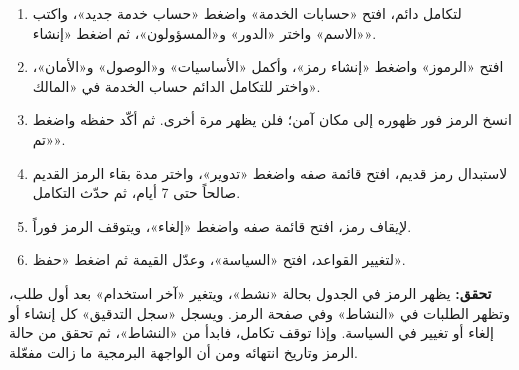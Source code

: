 \begin{enumerate}
\item لتكامل دائم، افتح «حسابات الخدمة» واضغط «حساب خدمة جديد»، واكتب «الاسم» واختر «الدور» و«المسؤولون»، ثم اضغط «إنشاء».
\item افتح «الرموز» واضغط «إنشاء رمز»، وأكمل «الأساسيات» و«الوصول» و«الأمان»، واختر للتكامل الدائم حساب الخدمة في «المالك».
\item انسخ الرمز فور ظهوره إلى مكان آمن؛ فلن يظهر مرة أخرى. ثم أكّد حفظه واضغط «تم».
\item لاستبدال رمز قديم، افتح قائمة صفه واضغط «تدوير»، واختر مدة بقاء الرمز القديم صالحاً حتى 7 أيام، ثم حدّث التكامل.
\item لإيقاف رمز، افتح قائمة صفه واضغط «إلغاء»، ويتوقف الرمز فوراً.
\item لتغيير القواعد، افتح «السياسة»، وعدّل القيمة ثم اضغط «حفظ».
\end{enumerate}

\textbf{تحقق:} يظهر الرمز في الجدول بحالة «نشط»، ويتغير «آخر استخدام» بعد أول طلب، وتظهر الطلبات في «النشاط» وفي صفحة الرمز. ويسجل «سجل التدقيق» كل إنشاء أو إلغاء أو تغيير في السياسة. وإذا توقف تكامل، فابدأ من «النشاط»، ثم تحقق من حالة الرمز وتاريخ انتهائه ومن أن الواجهة البرمجية ما زالت مفعّلة.
